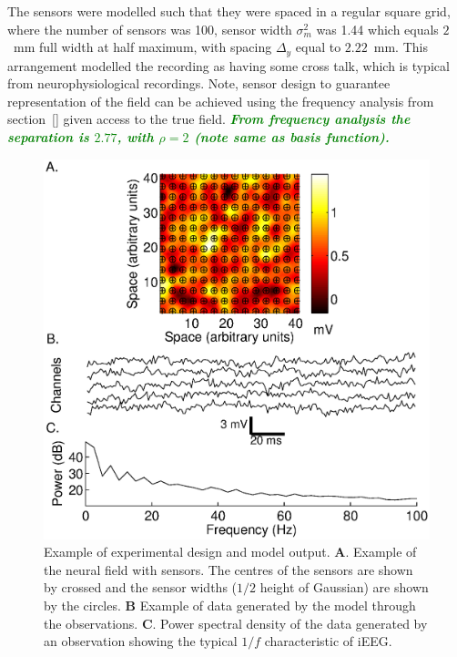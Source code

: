 \documentclass[12pt]{iopart}
\newcommand{\omg}[1]{\textsf{\emph{\textbf{\textcolor{green}{#1}}}}}
\begin{document}
The sensors were modelled such that they were spaced in a regular square grid, where the number of sensors was 100, sensor width $\sigma^2_m$ was 1.44 which equals $2$~mm full width at half maximum, with spacing $\Delta_y$ equal to $2.22$~mm. This arrangement modelled the recording as having some cross talk, which is typical from neurophysiological recordings. Note, sensor design to guarantee representation of the field can be achieved using the frequency analysis from section~\ref{} given access to the true field. \omg{From frequency analysis the separation is $2.77$, with $\rho = 2$ (note same as basis function).} 
\begin{figure}
	\begin{center}
		\includegraphics[scale=0.4]{./Graph/ExperimentFigure.eps} 
	\end{center}
	\caption{Example of experimental design and model output. \textbf{A}. Example of the neural field with sensors. The centres of the sensors are shown by crossed and the sensor widths ($1/2$ height of Gaussian) are shown by the circles. \textbf{B} Example of data generated by the model through the observations. \textbf{C}. Power spectral density of the data generated by an observation showing the typical $1/f$ characteristic of iEEG.} \label{fig:FrequencyAnalysis} 
\end{figure}
\end{document}
